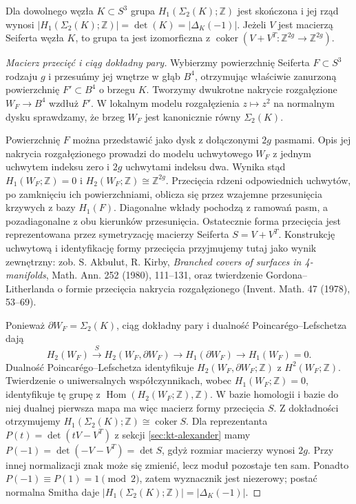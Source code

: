\begin{twierdzenie}
Dla dowolnego węzła $K\subset S^3$ grupa
$H_1(\Sigma_2(K);\mathbb Z)$ jest skończona i
jej rząd wynosi
$|H_1(\Sigma_2(K);\mathbb Z)|
=\det(K)=|\Delta_K(-1)|$.
Jeżeli $V$ jest macierzą Seiferta węzła $K$,
to grupa ta jest izomorficzna z
$\operatorname{coker}(V+V^T:\mathbb Z^{2g}\to\mathbb Z^{2g})$.
\end{twierdzenie}

\begin{proof}[Macierz przecięć i ciąg dokładny pary]
Wybierzmy powierzchnię Seiferta $F\subset S^3$ rodzaju $g$
i przesuńmy jej wnętrze w głąb $B^4$, otrzymując właściwie
zanurzoną powierzchnię $F'\subset B^4$ o brzegu $K$.
Tworzymy dwukrotne nakrycie rozgałęzione
$W_F\to B^4$ wzdłuż $F'$. W lokalnym modelu rozgałęzienia
$z\mapsto z^2$ na normalnym dysku sprawdzamy, że brzeg
$W_F$ jest kanonicznie równy $\Sigma_2(K)$.

Powierzchnię $F$ można przedstawić jako dysk z dołączonymi
$2g$ pasmami. Opis jej nakrycia rozgałęzionego prowadzi do
modelu uchwytowego $W_F$ z jednym uchwytem indeksu zero
i $2g$ uchwytami indeksu dwa. Wynika stąd
$H_1(W_F;\mathbb Z)=0$ i $H_2(W_F;\mathbb Z)\cong\mathbb Z^{2g}$.
Przecięcia rdzeni odpowiednich uchwytów, po zamknięciu ich
powierzchniami, oblicza się przez wzajemne przesunięcia
krzywych z bazy $H_1(F)$. Diagonalne wkłady pochodzą z
ramowań pasm, a pozadiagonalne z obu kierunków przesunięcia.
Ostatecznie forma przecięcia jest reprezentowana przez
symetryzację macierzy Seiferta $S=V+V^T$.
Konstrukcję uchwytową i identyfikację formy
przecięcia przyjmujemy tutaj jako wynik zewnętrzny:
zob. S. Akbulut, R. Kirby, \emph{Branched covers of
surfaces in 4-manifolds}, Math. Ann. 252 (1980),
111--131, oraz twierdzenie Gordona--Litherlanda
o formie przecięcia nakrycia rozgałęzionego
(Invent. Math. 47 (1978), 53--69).

Ponieważ $\partial W_F=\Sigma_2(K)$, ciąg dokładny pary
i dualność Poincarégo--Lefschetza dają
\[
H_2(W_F)\xrightarrow{\;S\;}H_2(W_F,\partial W_F)
\longrightarrow H_1(\partial W_F)\longrightarrow H_1(W_F)=0.
\]
Dualność Poincarégo--Lefschetza identyfikuje
$H_2(W_F,\partial W_F;\mathbb Z)$ z $H^2(W_F;\mathbb Z)$.
Twierdzenie o uniwersalnych współczynnikach, wobec
$H_1(W_F;\mathbb Z)=0$, identyfikuje tę grupę z
$\operatorname{Hom}(H_2(W_F;\mathbb Z),\mathbb Z)$.
W bazie homologii i bazie do niej dualnej pierwsza
mapa ma więc macierz formy przecięcia $S$.
Z dokładności otrzymujemy
$H_1(\Sigma_2(K);\mathbb Z)\cong\operatorname{coker}S$.
Dla reprezentanta $P(t)=\det(tV-V^T)$
z sekcji \ref{sec:kt-alexander} mamy
$P(-1)=\det(-V-V^T)=\det S$, gdyż rozmiar
macierzy wynosi $2g$. Przy innej normalizacji
znak może się zmienić, lecz moduł pozostaje ten sam.
Ponadto $P(-1)\equiv P(1)=1\pmod 2$, zatem
wyznacznik jest niezerowy; postać normalna Smitha daje
$|H_1(\Sigma_2(K);\mathbb Z)|=|\Delta_K(-1)|$.
\end{proof}


